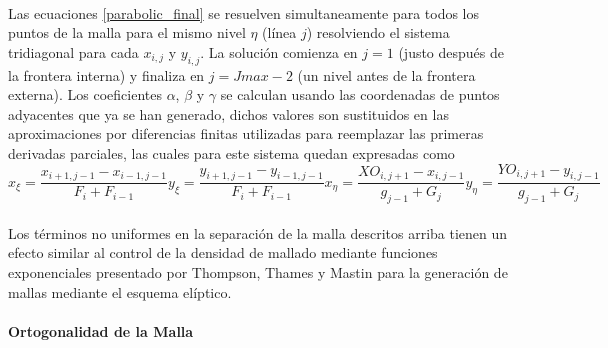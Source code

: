 \documentclass[letterpaper, openright, 12pt]{book}
\begin{document}
    \paragraph*{}
        Las ecuaciones \ref{parabolic_final} se resuelven simultaneamente para
        todos los puntos de la malla para el mismo nivel $\eta$ (línea $j$)
        resolviendo el sistema tridiagonal para cada $x_{i, j}$ y $y_{i, j}$. La
        solución comienza en $j = 1$ (justo después de la frontera interna) y
        finaliza en $j = Jmax - 2$ (un nivel antes de la frontera externa). Los
        coeficientes $\alpha$, $\beta$ y $\gamma$ se calculan usando las
        coordenadas de puntos adyacentes que ya se han generado, dichos valores
        son sustituidos en las aproximaciones por diferencias finitas utilizadas
        para reemplazar las primeras derivadas parciales, las cuales para este
        sistema quedan expresadas como\\
        \begin{subequations}
            \begin{equation}
                x_\xi = \frac{x_{i+1, j-1} - x_{i-1, j-1}}{F_i + F_{i-1}}
            \end{equation}
            \begin{equation}
                y_\xi = \frac{y_{i+1, j-1} - y_{i-1, j-1}}{F_i + F_{i-1}}
            \end{equation}
            \begin{equation}
                x_\eta = \frac{XO_{i, j+1} - x_{i, j-1}}{g_{j-1} + G_j}
            \end{equation}
            \begin{equation}
                y_\eta = \frac{YO_{i, j+1} - y_{i, j-1}}{g_{j-1} + G_j}
            \end{equation}
        \end{subequations}
    \paragraph*{}
        Los términos no uniformes en la separación de la malla descritos arriba
        tienen un efecto similar al control de la densidad de mallado mediante
        funciones exponenciales presentado por Thompson, Thames y Mastin
        \cite{thompson1974automatic} para la generación de mallas mediante el
        esquema elíptico.
    \paragraph*{Ortogonalidad de la Malla}
\end{document}
